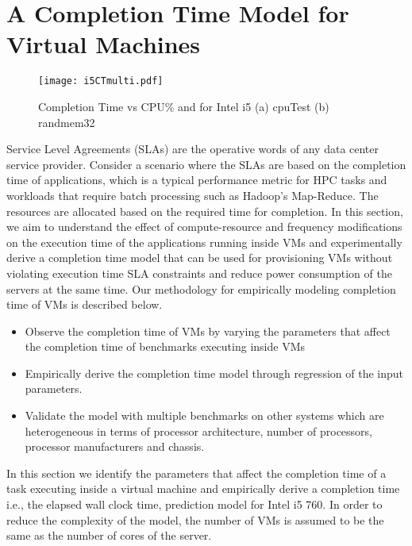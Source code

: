 \documentclass{sig-alternate}
\begin{document}
\section{A Completion Time Model for Virtual Machines}
\label{sec:PfModel}
\begin{figure*}[t]
\vspace{-0.5cm}
\centering
\texttt{[image: i5CTmulti.pdf]}
\caption{Completion Time vs CPU\% and  for Intel i5 (a) cpuTest (b) randmem32}
\label{fig:i5CTmulti}
\vspace{-0.5cm}
\end{figure*}
Service Level Agreements (SLAs) are the operative words of any data center service provider. Consider a scenario where the SLAs are based on the completion time of applications, which is a typical performance metric for HPC tasks and workloads that require batch processing such as Hadoop's Map-Reduce. The resources are allocated based on the required time for completion. In this section, we aim to understand the effect of compute-resource and frequency modifications on the execution time of the applications running inside VMs and experimentally derive a completion time model that can be used for provisioning VMs without violating execution time SLA constraints and reduce power consumption of the servers at the same time. Our methodology for empirically modeling completion time of VMs is described below.
\begin{itemize}
 \item Observe the completion time of VMs by varying the parameters that affect the completion time of benchmarks executing inside VMs
 \item Empirically derive the completion time model through regression of the input parameters.
 \item Validate the model with multiple benchmarks on other systems which are heterogeneous in terms of processor architecture, number of processors, processor manufacturers and chassis. 
\end{itemize}
In this section we identify the parameters that affect the completion time of a task executing inside a virtual machine and empirically derive a completion time i.e., the elapsed wall clock time, prediction model for Intel i5 760. In order to reduce the complexity of the model, the number of VMs is assumed to be the same as the number of cores of the server.
\end{document}
